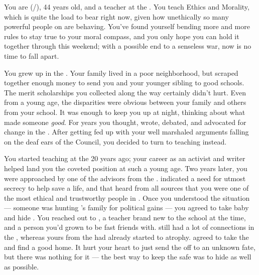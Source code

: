 \documentclass[char]{GL2020}
\begin{document}
\name{\cEthics{}}

You are \cEthics{\full} (\cEthics{\they}/\cEthics{\them}), 44 years old, and a teacher at the \pSchool{}. You teach Ethics and Morality, which is quite the load to bear right now, given how unethically so many powerful people on \pEarth{} are behaving. You've found yourself bending more and more rules to stay true to your moral compass, and you only hope you can hold it together through this weekend; with a possible end to a senseless war, now is no time to fall apart.

You grew up in the \pTech{}. Your family lived in a poor neighborhood, but scraped together enough money to send you and your younger sibling to good schools. The merit scholarships you collected along the way certainly didn't hurt. Even from a young age, the disparities were obvious between your family and others from your school. It was enough to keep you up at night, thinking about what made someone \emph{good}. For years you thought, wrote, debated, and advocated for change in the \pTech{}. After getting fed up with your well marshaled arguments falling on the deaf ears of the Council, you decided to turn to teaching instead.

You started teaching at the \pSc{} 20 years ago; your career as an activist and writer helped land you the coveted position at such a young age. Two years later, you were approached by one of the advisors from the \pFarm{}. \cEvil{\They} indicated a need for utmost secrecy to help save a life, and that  heard from all sources that you were one of the most ethical and trustworthy people in \pEarth{}. Once you understood the situation — someone was hunting \cEvil{\full}'s family for political gains — you agreed to take \cEvil{\their} baby \cPirateChild{\child} and hide \cPirateChild{\them}. You reached out to \cPirate{\full}, a teacher brand new to the school at the time, and a person you'd grown to be fast friends with. \cPirate{\They} still had a lot of connections in the \pShip{}, whereas yours from the \pTech{} had already started to atrophy. \cPirate{} agreed to take the \cPirateChild{\child} and find \cPirateChild{\them} a good home. It hurt your heart to just send the \cPirateChild{\child} off to an unknown fate, but there was nothing for it — the best way to keep the \cPirateChild{\child} safe was to hide \cPirateChild{\them} as well as possible.
\end{document}

